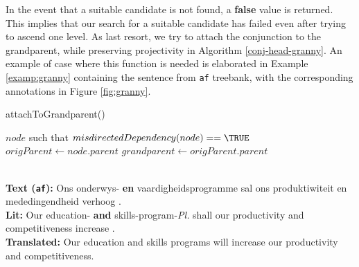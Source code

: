 In the event that a suitable candidate is not found, a \textbf{false} value is returned. This implies that our search for a suitable candidate has failed even after trying to ascend one level. As last resort, we try to attach the conjunction to the grandparent, while preserving projectivity in Algorithm \ref{conj-head-granny}. An example of case where this function is needed is elaborated in Example \ref{examp:granny} containing the sentence from \verb|af| treebank, with the corresponding annotations in Figure \ref{fig:granny}.

\begin{algorithm}[H]
\caption{attachToGrandparent()}
\label{conj-head-granny}
\begin{algorithmic}[1]
\REQUIRE $node$ such that $misdirectedDependency(node) == \TRUE$
\STATE {}
\STATE $origParent \leftarrow node.parent$
\STATE $grandparent \leftarrow origParent.parent$
    \RETURN \TRUE
\ENDIF
\RETURN \FALSE
\end{algorithmic}
\end{algorithm}

\begin{example}
\label{examp:granny}
\textbf{ }\\
\textbf{Text (\texttt{af}):} Ons onderwys- \textbf{en} vaardigheidsprogramme sal ons produktiwiteit en mededingendheid verhoog . \\
\textbf{Lit:} Our education- \textbf{and} skills-program-\textit{Pl.} shall our productivity and competitiveness increase .\\
\textbf{Translated:} Our education and skills programs will increase our productivity and competitiveness.
\end{example}

